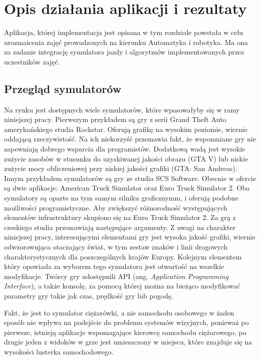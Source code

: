 \chapter{Opis działania aplikacji i rezultaty}



Aplikacja, której implementacja jest opisana w tym rozdziale powstała w celu urozmaicenia zajęć prowadzonych na kierunku Automatyka i robotyka. Ma ona za zadanie integrację symulatora jazdy i algorytmów implementowanych przez uczestników zajęć. 

\section{Przegląd symulatorów}
\label{sec:ets2}
Na rynku jest dostępnych wiele symulatorów, które wpasowałyby się w ramy niniejszej pracy. Pierwszym przykładem są gry z serii Grand Theft Auto amerykańskiego studia Rockstar. Oferują grafikę na wysokim poziomie, wiernie oddającą rzeczywistość. Na ich niekorzyść przemawia fakt, że wspomniane gry nie zapewniają dobrego wsparcia dla programistów. Dodatkową wadą jest wysokie zużycie zasobów w stusunku do uzyskiwanej jakości obrazu (GTA V) lub niskie zużycie mocy obliczeniowej przy niskiej jakości grafiki (GTA: San Andreas).
Innym przykładem symulatorów są gry ze studia SCS Software. Obecnie w ofercie są dwie aplikacje: American Truck Simulator oraz Euro Truck Simulator 2. Oba symulatory są oparte na tym samym silniku graficznymm, i oferują podobne możliwości programistyczne. 
Aby zwiększyć różnorodność występujących elementów infrastruktury skupiono się na Euro Truck Simulator 2.
Za grą z czeskiego studia przemawiają następujące argumenty. Z uwagi na charakter niniejszej pracy, interesującymi elementami gry jest wysoka jakość grafiki, wiernie odwzorowująca otaczający świat, w tym zestaw znaków i linii drogowych charakterystycznych dla poszczególnych krajów Europy. 
Kolejnym elementem który opowiada za wyborem tego symulatora jest otwartość na wszelkie modyfikacje. 
Twórcy gry udostępnili API (ang. \textit{Application Programming Interface}), a także konsolę, za pomocą której można na bieżąco modyfikować parametry gry takie jak czas, prędkość gry lub pogodę.

Fakt, że jest to symulator ciężarówki, a nie samochodu osobowego w żaden sposób nie wpływa na podejście do problemu systemów wizyjnych, ponieważ po pierwsze, istnieją aplikacje wspomagające kierowcę samochodu ciężarowego, po drugie jeden z widoków w grze jest umieszczony w miejscu, które znajduje się na wysokości lusterka samochodowego.

